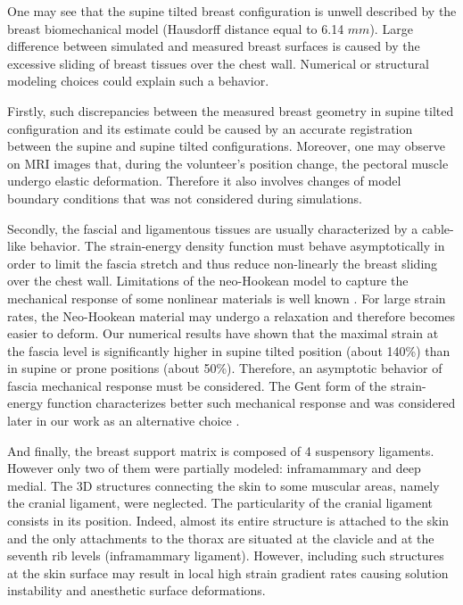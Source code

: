 One may see that the supine tilted breast configuration is unwell described by the breast biomechanical model (Hausdorff distance equal to 6.14 $mm$). Large difference between simulated and measured breast surfaces is caused by the excessive sliding of breast tissues over the chest wall. Numerical or structural modeling choices could explain such a behavior.

Firstly, such discrepancies between the measured breast geometry in supine tilted configuration and its estimate could be caused by an accurate registration between the supine and supine tilted configurations. Moreover, one may observe on MRI images that, during the volunteer's position change, the pectoral muscle undergo elastic deformation. Therefore it also involves changes of model boundary conditions that was not considered during simulations.

Secondly, the fascial and ligamentous tissues are usually characterized by a cable-like behavior. The strain-energy density function must behave asymptotically in order to limit the fascia stretch and thus reduce non-linearly the breast sliding over the chest wall. Limitations of the neo-Hookean model to capture the mechanical response of some nonlinear materials is well known \citep{kaliske_finite_1997}. For large strain rates, the Neo-Hookean material may undergo a relaxation and therefore becomes easier to deform.  Our numerical results have shown that the maximal strain at the fascia level is significantly higher in supine tilted position (about 140\%) than in supine or prone positions (about 50\%).  Therefore, an asymptotic behavior of fascia mechanical response must be considered.  The Gent  form of the strain-energy function characterizes better such mechanical response \citep{gent_new_1996} and was considered later in our work as an alternative choice .

And finally, the breast support matrix is composed of 4 suspensory ligaments. However only two of them were partially modeled: inframammary and deep medial. The 3D structures connecting the skin to some muscular areas, namely the cranial ligament,  were neglected.  The particularity  of the cranial ligament consists in its position. Indeed,  almost its entire structure is attached to the skin and the only attachments to the thorax are situated at the clavicle and at the seventh rib levels (inframammary ligament). However, including such structures at the skin surface may result in local high strain gradient rates causing solution instability and anesthetic surface deformations. 
 

